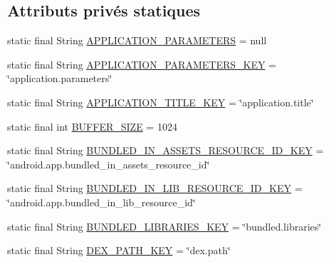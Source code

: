 \subsection*{Attributs privés statiques}
\begin{DoxyCompactItemize}
\item 
static final String \hyperlink{classorg_1_1qtproject_1_1qt5_1_1android_1_1bindings_1_1_qt_activity_a937cdab8f1ed3cd586583d88451925cd}{A\-P\-P\-L\-I\-C\-A\-T\-I\-O\-N\-\_\-\-P\-A\-R\-A\-M\-E\-T\-E\-R\-S} = null
\item 
static final String \hyperlink{classorg_1_1qtproject_1_1qt5_1_1android_1_1bindings_1_1_qt_activity_ae1f6a110a88016081007182f746540e9}{A\-P\-P\-L\-I\-C\-A\-T\-I\-O\-N\-\_\-\-P\-A\-R\-A\-M\-E\-T\-E\-R\-S\-\_\-\-K\-E\-Y} = \char`\"{}application.\-parameters\char`\"{}
\item 
static final String \hyperlink{classorg_1_1qtproject_1_1qt5_1_1android_1_1bindings_1_1_qt_activity_af4f23851df97539f4624239760dc422b}{A\-P\-P\-L\-I\-C\-A\-T\-I\-O\-N\-\_\-\-T\-I\-T\-L\-E\-\_\-\-K\-E\-Y} = \char`\"{}application.\-title\char`\"{}
\item 
static final int \hyperlink{classorg_1_1qtproject_1_1qt5_1_1android_1_1bindings_1_1_qt_activity_a837ce539bec41f495bfb09537e9080b5}{B\-U\-F\-F\-E\-R\-\_\-\-S\-I\-Z\-E} = 1024
\item 
static final String \hyperlink{classorg_1_1qtproject_1_1qt5_1_1android_1_1bindings_1_1_qt_activity_af1986a508d85b5d92de383c363423897}{B\-U\-N\-D\-L\-E\-D\-\_\-\-I\-N\-\_\-\-A\-S\-S\-E\-T\-S\-\_\-\-R\-E\-S\-O\-U\-R\-C\-E\-\_\-\-I\-D\-\_\-\-K\-E\-Y} = \char`\"{}android.\-app.\-bundled\-\_\-in\-\_\-assets\-\_\-resource\-\_\-id\char`\"{}
\item 
static final String \hyperlink{classorg_1_1qtproject_1_1qt5_1_1android_1_1bindings_1_1_qt_activity_ae43184b37ba175ea26b5993c2afae68b}{B\-U\-N\-D\-L\-E\-D\-\_\-\-I\-N\-\_\-\-L\-I\-B\-\_\-\-R\-E\-S\-O\-U\-R\-C\-E\-\_\-\-I\-D\-\_\-\-K\-E\-Y} = \char`\"{}android.\-app.\-bundled\-\_\-in\-\_\-lib\-\_\-resource\-\_\-id\char`\"{}
\item 
static final String \hyperlink{classorg_1_1qtproject_1_1qt5_1_1android_1_1bindings_1_1_qt_activity_adc2dfe1bdf822d0955cbaf2c881cf213}{B\-U\-N\-D\-L\-E\-D\-\_\-\-L\-I\-B\-R\-A\-R\-I\-E\-S\-\_\-\-K\-E\-Y} = \char`\"{}bundled.\-libraries\char`\"{}
\item 
static final String \hyperlink{classorg_1_1qtproject_1_1qt5_1_1android_1_1bindings_1_1_qt_activity_ae5aa0233d6c36a21c88e4e66dfe19c5b}{D\-E\-X\-\_\-\-P\-A\-T\-H\-\_\-\-K\-E\-Y} = \char`\"{}dex.\-path\char`\"{}

\end{DoxyCompactItemize}
